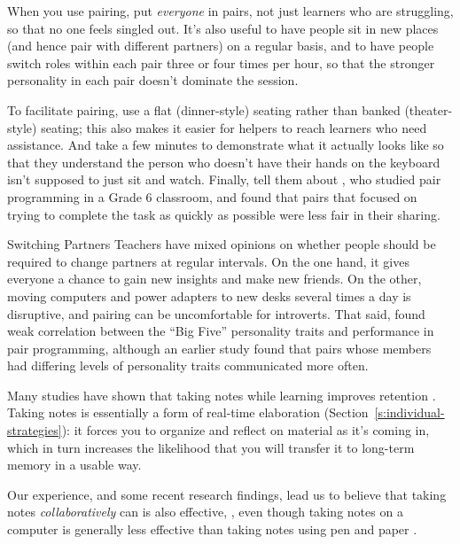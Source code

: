 When you use pairing, put \emph{everyone} in pairs, not just learners who are
struggling, so that no one feels singled out. It's also useful to have
people sit in new places (and hence pair with different partners) on a
regular basis, and to have people switch roles within each pair three or
four times per hour, so that the stronger personality in each pair
doesn't dominate the session.

To facilitate pairing, use a flat (dinner-style) seating rather than
banked (theater-style) seating; this also makes it easier for helpers to
reach learners who need assistance. And take a few minutes to
demonstrate what it actually looks like so that they understand the
person who doesn't have their hands on the keyboard isn't supposed to
just sit and watch. Finally, tell them about \cite{Lewi2015}, who
studied pair programming in a Grade 6 classroom, and found that pairs
that focused on trying to complete the task as quickly as possible were
less fair in their sharing.

\begin{aside}{Switching Partners}
  Teachers have mixed opinions on whether people should be required to
  change partners at regular intervals. On the one hand, it gives
  everyone a chance to gain new insights and make new friends. On the
  other, moving computers and power adapters to new desks several times
  a day is disruptive, and pairing can be uncomfortable for introverts.
  That said, \cite{Hann2010} found weak correlation between the ``Big
  Five'' personality traits and performance in pair programming, although
  an earlier study \cite{Wall2009} found that pairs whose members had
  differing levels of personality traits communicated more often.
\end{aside}


Many studies have shown that taking notes while learning improves
retention \cite{Aike1975,Boha2011}. Taking notes is essentially a
form of real-time elaboration (Section~\ref{s:individual-strategies}): it
forces you to organize and reflect on material as it's coming in, which
in turn increases the likelihood that you will transfer it to long-term
memory in a usable way.

Our experience, and some recent research findings, lead us to believe
that taking notes \emph{collaboratively} can is also effective,
\cite{Ornd2015,Yang2015}, even though taking notes on a
computer is generally less effective than taking notes using pen and
paper \cite{Muel2014}.


